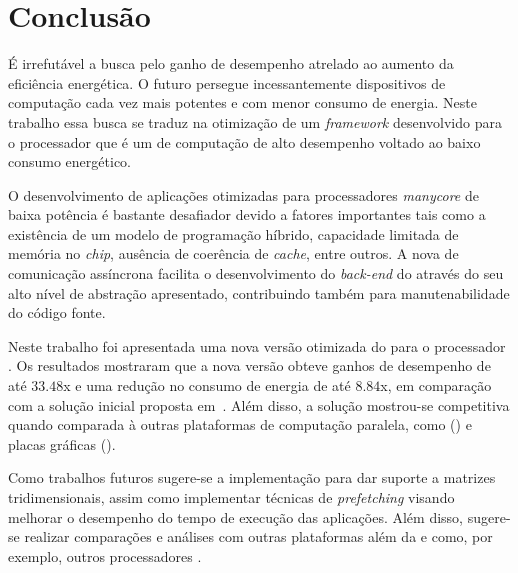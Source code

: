 %

\chapter{Conclusão}
\label{cap:conclusao}

É irrefutável a busca pelo ganho de desempenho atrelado ao aumento da eficiência energética. O futuro persegue incessantemente dispositivos de computação cada vez mais potentes e com menor consumo de energia. Neste trabalho essa busca se traduz na otimização de um \textit{framework} desenvolvido para o processador \mppa que é um \chip de computação de alto desempenho voltado ao baixo consumo energético. 

O desenvolvimento de aplicações otimizadas para processadores \textit{manycore} de baixa potência é bastante desafiador devido a fatores importantes tais como a existência de um modelo de programação híbrido, capacidade limitada de memória no \textit{chip}, ausência de coerência de \textit{cache}, entre outros. A nova \api de comunicação assíncrona facilita o desenvolvimento do \textit{back-end} do \fw através do seu alto nível de abstração apresentado, contribuindo também para manutenabilidade do código fonte.

Neste trabalho foi apresentada uma nova versão otimizada do \fw \pskel para o processador \mppa. Os resultados mostraram que a nova versão obteve ganhos de desempenho de até $33.48$x e uma redução no consumo de energia de até $8.84$x, em comparação com a solução inicial proposta em~\cite{Podesta:TCC}. Além disso, a solução mostrou-se competitiva quando comparada à outras plataformas de computação paralela, como \multicore (\cpu) e placas gráficas (\gpu). 

Como trabalhos futuros sugere-se a implementação para dar suporte a matrizes tridimensionais, assim como implementar técnicas de \textit{prefetching} visando melhorar o desempenho do tempo de execução das aplicações. Além disso, sugere-se realizar comparações e análises com outras plataformas além da \cpu e \gpu como, por exemplo, outros processadores \manycore.